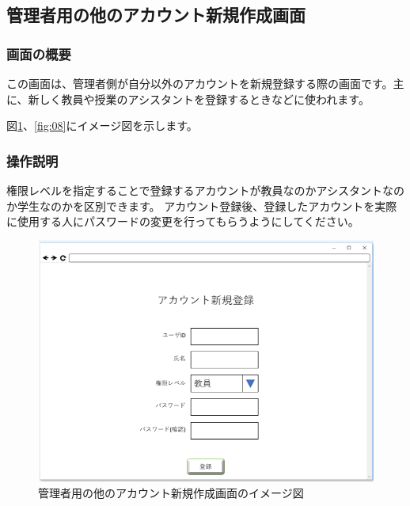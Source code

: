 \newpage

\subsection{管理者用の他のアカウント新規作成画面}
\subsubsection{画面の概要}
この画面は、管理者側が自分以外のアカウントを新規登録する際の画面です。主に、新しく教員や授業のアシスタントを登録するときなどに使われます。

図\ref{fig:07}、\ref{fig:08}にイメージ図を示します。

\subsubsection{操作説明}
権限レベルを指定することで登録するアカウントが教員なのかアシスタントなのか学生なのかを区別できます。
アカウント登録後、登録したアカウントを実際に使用する人にパスワードの変更を行ってもらうようにしてください。

\begin{figure}[phtbp]
  \begin{center}
    \includegraphics[width=1\linewidth,clip]{./img/07.png}
    \caption{管理者用の他のアカウント新規作成画面のイメージ図}\label{fig:07}
  \end{center}
\end{figure}


